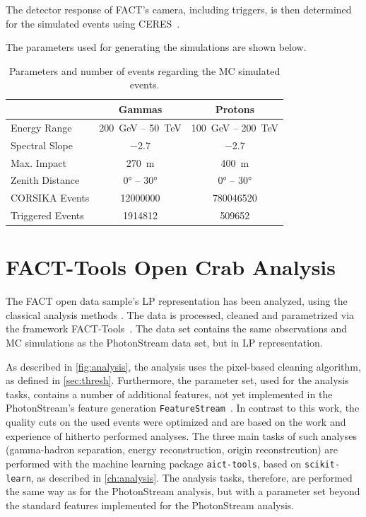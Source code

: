 The detector response of FACT's camera, including
triggers, is then determined for the simulated events using CERES~\cite{ceres}.

The parameters used for generating the simulations are shown below.

\begin{table}
  \centering%
  \begin{tabular}{l
                  c
                  c}
      \toprule
      {}    & Gammas  & Protons      \\
      \midrule
      Energy Range & \SI{200}{\GeV} – \SI{50}{\TeV} & \SI{100}{\GeV} – \SI{200}{\TeV} \\
      Spectral Slope & \num{-2.7} & \num{-2.7} \\
      Max. Impact & \SI{270}{\meter} & \SI{400}{\meter} \\
      Zenith Distance & \ang{0} – \ang{30} & \ang{0} – \ang{30} \\
      CORSIKA Events & \num{12000000} & \num{780046520}\\
      Triggered Events & \num{1914812} & \num{509652}\\
      \bottomrule
  \end{tabular}
  \caption{Parameters and number of events regarding the MC simulated events.}
  \label{tab:mcs}
\end{table}

\section{FACT-Tools Open Crab Analysis}\label{sec:facttools}
%
The FACT open data sample's LP representation has been analyzed, using the
classical analysis methods \cite{openana}. The data is processed, cleaned and
parametrized via the framework FACT-Tools~\cite{facttools}. The data set
contains the same observations and MC simulations as the PhotonStream data set,
but in LP representation.

As described in \autoref{fig:analysis}, the analysis uses the pixel-based
cleaning algorithm, as defined in \autoref{sec:thresh}. Furthermore, the
parameter set, used for the analysis tasks, contains a number of additional
features, not yet implemented in the PhotonStream's feature generation
\texttt{FeatureStream}~\cite{FeatureStream}. In contrast to this work, the
quality cuts on the used events were optimized and are based on the work and
experience of hitherto performed analyses. The three main tasks of such
analyses (gamma-hadron separation, energy reconstruction, origin
reconstrcution) are performed with the machine learning package \texttt{aict-tools}, based on \texttt{scikit-learn}, as described in \autoref{ch:analysis}.
The analysis tasks, therefore, are performed the same way as for the
PhotonStream analysis, but with a parameter set beyond the standard features implemented for the PhotonStream analysis.

